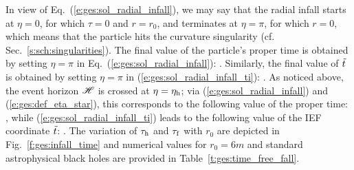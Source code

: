 In view of Eq.~(\ref{e:ges:sol_radial_infall}), we may say that the radial
infall starts at $\eta=0$, for which $\tau=0$ and $r=r_0$, and terminates
at $\eta=\pi$, for which $r=0$, which means that the particle hits the curvature
singularity (cf. Sec.~\ref{s:sch:singularities}).
The final value of the particle's proper time is obtained by
setting $\eta=\pi$ in Eq.~(\ref{e:ges:sol_radial_infall}):
\be
     .
\ee
Similarly, the final value of ${\tilde t}$ is obtained by setting $\eta=\pi$ in (\ref{e:ges:sol_radial_infall_ti}):
\be
     .
\ee
As noticed above, the event horizon $\mathscr{H}$ is crossed at $\eta=\eta_{\rm h}$;
via (\ref{e:ges:sol_radial_infall}) and (\ref{e:ges:def_eta_star}), this corresponds to the following value
of the proper time:
\be
     ,
\ee
while (\ref{e:ges:sol_radial_infall_ti}) leads to the following value
of the IEF coordinate ${\tilde t}$:
\be
     .
\ee
The variation of $\tau_{\rm h}$ and $\tau_{\rm f}$ with $r_0$ are depicted in
Fig.~\ref{f:ges:infall_time} and numerical values for $r_0=6m$ and
standard astrophysical black holes are provided in
Table~\ref{t:ges:time_free_fall}.

